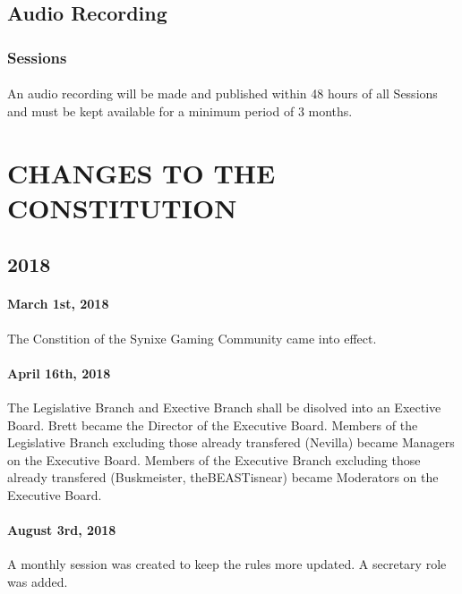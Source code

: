 \documentclass[10pt,a4paper]{article}
\begin{document}
\subsection{Audio Recording}
\subsubsection{Sessions}
\paragraph{}
An audio recording will be made and published within 48 hours of all Sessions and must be kept available for a minimum period of 3 months.
\section{CHANGES TO THE CONSTITUTION}
\subsection{2018}
\paragraph{March 1st, 2018}
The Constition of the Synixe Gaming Community came into effect.
\paragraph{April 16th, 2018}
The Legislative Branch and Exective Branch shall be disolved into an Exective Board. Brett became the Director of the Executive Board. Members of the Legislative Branch excluding those already transfered (Nevilla) became Managers on the Executive Board. Members of the Executive Branch excluding those already transfered (Buskmeister, theBEASTisnear) became Moderators on the Executive Board.
\paragraph{August 3rd, 2018}
A monthly session was created to keep the rules more updated. A secretary role was added.
\end{document}
